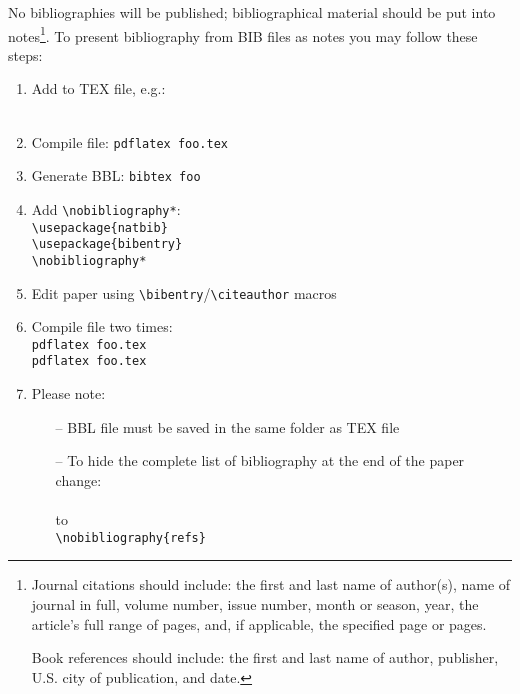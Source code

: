 \documentclass{jphilart}
\begin{document}
No bibliographies will be published; bibliographical
material should be put into notes\footnote{Journal citations should include:
the first and last name of author(s), name of journal in full, volume number,
issue number, month or season, year, the article's full range of pages, and,
if applicable, the specified page or pages.

Book references should include: the first and last name of author,
publisher, U.S. city of publication, and date.}.
To present bibliography from BIB files as notes you may follow
these steps:
\begin{enumerate}
  \item Add \verb++ to TEX file, e.g.:\\
    \verb++\\
    \verb++

  \item Compile file: \texttt{pdflatex foo.tex}

  \item Generate BBL: \texttt{bibtex foo}

  \item Add \verb+\nobibliography*+:\\
    \verb+\usepackage{natbib}+\\
    \verb+\usepackage{bibentry}+\\
    \verb+\nobibliography*+

  \item Edit paper using \verb+\bibentry+/\verb+\citeauthor+ macros

  \item Compile file two times:\\
    \texttt{pdflatex foo.tex}\\
    \texttt{pdflatex foo.tex}

  \item Please note:
  \begin{itemize}
    \item[--] BBL file must be saved in the same folder as TEX file
    \item[--] To hide the complete list of bibliography at the end of the paper change:\\
      \verb++\\
    to\\
      \verb+\nobibliography{refs}+
  \end{itemize}
\end{enumerate}

\end{document}
